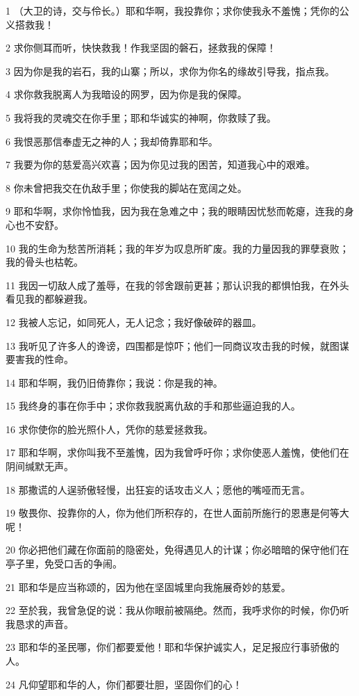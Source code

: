 \par 1 （大卫的诗，交与伶长。）耶和华啊，我投靠你；求你使我永不羞愧；凭你的公义搭救我！
\par 2 求你侧耳而听，快快救我！作我坚固的磐石，拯救我的保障！
\par 3 因为你是我的岩石，我的山寨；所以，求你为你名的缘故引导我，指点我。
\par 4 求你救我脱离人为我暗设的网罗，因为你是我的保障。
\par 5 我将我的灵魂交在你手里；耶和华诚实的神啊，你救赎了我。
\par 6 我恨恶那信奉虚无之神的人；我却倚靠耶和华。
\par 7 我要为你的慈爱高兴欢喜；因为你见过我的困苦，知道我心中的艰难。
\par 8 你未曾把我交在仇敌手里；你使我的脚站在宽阔之处。
\par 9 耶和华啊，求你怜恤我，因为我在急难之中；我的眼睛因忧愁而乾瘪，连我的身心也不安舒。
\par 10 我的生命为愁苦所消耗；我的年岁为叹息所旷废。我的力量因我的罪孽衰败；我的骨头也枯乾。
\par 11 我因一切敌人成了羞辱，在我的邻舍跟前更甚；那认识我的都惧怕我，在外头看见我的都躲避我。
\par 12 我被人忘记，如同死人，无人记念；我好像破碎的器皿。
\par 13 我听见了许多人的谗谤，四围都是惊吓；他们一同商议攻击我的时候，就图谋要害我的性命。
\par 14 耶和华啊，我仍旧倚靠你；我说：你是我的神。
\par 15 我终身的事在你手中；求你救我脱离仇敌的手和那些逼迫我的人。
\par 16 求你使你的脸光照仆人，凭你的慈爱拯救我。
\par 17 耶和华啊，求你叫我不至羞愧，因为我曾呼吁你；求你使恶人羞愧，使他们在阴间缄默无声。
\par 18 那撒谎的人逞骄傲轻慢，出狂妄的话攻击义人；愿他的嘴哑而无言。
\par 19 敬畏你、投靠你的人，你为他们所积存的，在世人面前所施行的恩惠是何等大呢！
\par 20 你必把他们藏在你面前的隐密处，免得遇见人的计谋；你必暗暗的保守他们在亭子里，免受口舌的争闹。
\par 21 耶和华是应当称颂的，因为他在坚固城里向我施展奇妙的慈爱。
\par 22 至於我，我曾急促的说：我从你眼前被隔绝。然而，我呼求你的时候，你仍听我恳求的声音。
\par 23 耶和华的圣民哪，你们都要爱他！耶和华保护诚实人，足足报应行事骄傲的人。
\par 24 凡仰望耶和华的人，你们都要壮胆，坚固你们的心！

